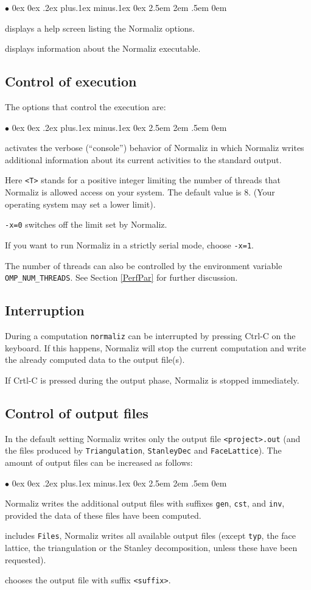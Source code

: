 \documentclass[12pt,a4paper]{scrartcl}
\newcounter{listi}
\newcommand{\stdli}{ \topsep0ex \partopsep0ex %
\parsep.2ex plus.1ex minus.1ex \itemsep0ex%
\leftmargin2.5em \labelwidth2em \labelsep.5em \rightmargin0em}%
\renewenvironment{itemize}{\begin{list}{{$\bullet$}}{\stdli}}{\end{list}}
\theoremstyle{definition}
\def\itemtt[#1]{\item[\textbf{\ttt{#1}}]}
\def\ttt{\texttt}
\begin{document}
\begin{itemize}
\itemtt [-{}-help, -?] displays a help screen listing the Normaliz options.

\itemtt [-{}-version] displays information about the Normaliz executable.
\end{itemize}


\subsection{Control of execution}\label{exec}

The options that control the execution are:

\begin{itemize}
	\itemtt[{-}{-}verbose, -c] activates the verbose (``console'') behavior of
	Normaliz in which Normaliz writes additional
	information about its current activities to the
	standard output.
	
	\itemtt[-x=<T>] Here \ttt{<T>} stands for a positive
	integer limiting the number of threads that Normaliz
	is allowed access on your system. The default value is
	$8$. (Your operating system may set a lower limit).
	
	\ttt{-x=0} switches off the limit set by Normaliz.
	
	If you want to run
	Normaliz in a strictly serial mode, choose
	\ttt{-x=1}.
\end{itemize}

The number of threads can also be controlled by the environment
variable \verb+OMP_NUM_THREADS+. See Section \ref{PerfPar} for
further discussion.

\subsection{Interruption}\label{interrupt}

During a computation \verb|normaliz| can be interrupted by pressing Ctrl-C on the keyboard. If this happens, Normaliz will stop the current computation and write the already computed data to the output file(s).

If Crtl-C is pressed during the output phase, Normaliz is stopped immediately.

\subsection{Control of output files}\label{outcontrol}

In the default setting Normaliz writes only the output file
\ttt{<project>.out} (and the files produced by \ttt{Triangulation}, \ttt{StanleyDec} and \ttt{FaceLattice}). The
amount of output files can be
increased as follows:
\begin{itemize}
	\itemtt[{-}{-}files, -f] Normaliz writes the additional output files
	with suffixes \ttt{gen}, \ttt{cst}, and \ttt{inv},
	provided the data of these files have been computed.
	\itemtt[{-}{-}all-files, -a] includes \ttt{Files}, Normaliz writes all
	available output files (except \verb|typ|, the face lattice, the triangulation or the
	Stanley decomposition, unless these have been requested).
	\itemtt [{-}{-}<suffix>] chooses the output file with suffix \verb|<suffix>|.
\end{itemize}
\end{document}
